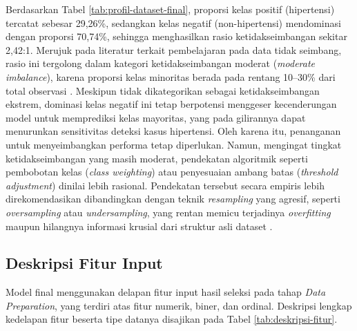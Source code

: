 Berdasarkan Tabel \ref{tab:profil-dataset-final}, proporsi kelas positif (hipertensi) tercatat sebesar 29,26\%, sedangkan kelas negatif (non-hipertensi) mendominasi dengan proporsi 70,74\%, sehingga menghasilkan rasio ketidakseimbangan sekitar 2,42:1. Merujuk pada literatur terkait pembelajaran pada data tidak seimbang, rasio ini tergolong dalam kategori ketidakseimbangan moderat (\textit{moderate imbalance}), karena proporsi kelas minoritas berada pada rentang 10--30\% dari total observasi \cite{krawczyk2016}. Meskipun tidak dikategorikan sebagai ketidakseimbangan ekstrem, dominasi kelas negatif ini tetap berpotensi menggeser kecenderungan model untuk memprediksi kelas mayoritas, yang pada gilirannya dapat menurunkan sensitivitas deteksi kasus hipertensi. Oleh karena itu, penanganan untuk menyeimbangkan performa tetap diperlukan. Namun, mengingat tingkat ketidakseimbangan yang masih moderat, pendekatan algoritmik seperti pembobotan kelas (\textit{class weighting}) atau penyesuaian ambang batas (\textit{threshold adjustment}) dinilai lebih rasional. Pendekatan tersebut secara empiris lebih direkomendasikan dibandingkan dengan teknik \textit{resampling} yang agresif, seperti \textit{oversampling} atau \textit{undersampling}, yang rentan memicu terjadinya \textit{overfitting} maupun hilangnya informasi krusial dari struktur asli dataset \cite{he2009}.

\subsection{Deskripsi Fitur Input}
Model final menggunakan delapan fitur input hasil seleksi pada tahap \emph{Data Preparation}, yang terdiri atas fitur numerik, biner, dan ordinal. Deskripsi lengkap kedelapan fitur beserta tipe datanya disajikan pada Tabel \ref{tab:deskripsi-fitur}.

